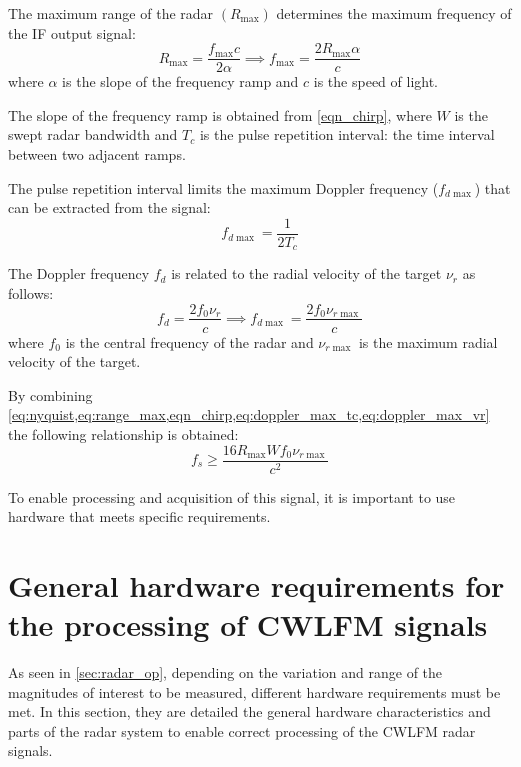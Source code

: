 The maximum range of the radar $(R_{\max})$ determines the maximum frequency of the IF output signal:
\begin{equation}\label{eq:range_max}
	R_{\max} = \frac{f_{\max} c}{2 \alpha} \implies f_{\max} = \frac{2R_{\max} \alpha}{c}
\end{equation}
where $\alpha$ is the slope of the frequency ramp and $c$ is the speed of light.

The slope of the frequency ramp is obtained from \cref{eqn_chirp}, where $W$ is the swept radar bandwidth and $T_c$ is the pulse repetition interval: the time interval between two adjacent ramps.

The pulse repetition interval limits the maximum Doppler frequency ($f_{d\max}$) that can be extracted from the signal:
\begin{equation} \label{eq:doppler_max_tc}
	f_{d\max} = \frac{1}{2 T_c}
\end{equation}

The Doppler frequency $f_d$ is related to the radial velocity of the target $\nu_r$ as follows:
\begin{equation} \label{eq:doppler_max_vr}
	f_d = \frac{2 f_0 \nu_r}{c} \implies f_{d\max} = \frac{2 f_0 \nu_{r\max}}{c}
\end{equation}
where $f_0$ is the central frequency of the radar and $\nu_{r\max}$ is the maximum radial velocity of the target.

By combining \cref{eq:nyquist,eq:range_max,eqn_chirp,eq:doppler_max_tc,eq:doppler_max_vr} the following relationship is obtained:
\begin{equation} \label{eq:fs_final}
	f_s \ge \frac{16 R_{\max}W f_0 \nu_{r\max}}{c^2}
\end{equation}

To enable processing and acquisition of this signal, it is important to use hardware that meets specific requirements.

\section[General hardware requirements for CWLFM signal processing]{General hardware requirements for the processing of CWLFM signals} \label{sec:general_hw_req}

As seen in \cref{sec:radar_op}, depending on the variation and range of the magnitudes of interest to be measured, different hardware requirements must be met. In this section, they are detailed the general hardware characteristics and parts of the radar system to enable correct processing of the CWLFM radar signals.

